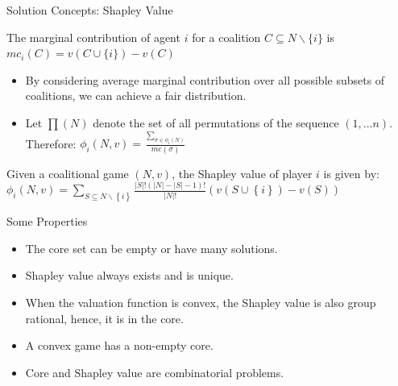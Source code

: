\documentclass{beamer}
\begin{document}
%
\begin{frame}{Solution Concepts: Shapley Value}
    \begin{definition} \label{dfn:marginalcontribution}
        The {\color{blue}marginal contribution} of agent $i$ for a coalition $C \subseteq N \backslash \{i\}$ is $mc_i(C) = v(C \cup \{i\}) - v(C)$
    \end{definition}

    \begin{itemize}
        \item By considering average marginal contribution over all possible subsets of coalitions, we can achieve a fair distribution.\\
        \item Let $\prod(N)$ denote the set of all permutations of the sequence $(1,...n)$. Therefore: $\phi_i(N,v) = \frac{\sum_{\sigma \in \phi_i(N)}}{mc(\sigma)}$
    \end{itemize}

    \begin{definition} \label{dfn:shapleyvalue}
        Given a coalitional game $(N,v)$, the Shapley value of player $i$ is given by: \\
        $\phi_i(N,v) = \sum_{S \subseteq N \backslash \left\{i\right\} } \frac{|S|! (|N|-|S|-1)!}{|N|!} (v(S \cup \left\{i\right\}) - v(S))$
    \end{definition}
\end{frame}
\begin{frame}{Some Properties}
    \begin{itemize}
        \item The core set can be empty or have many solutions.
        \item Shapley value always exists and is unique.
        \item When the valuation function is {\color{blue}convex}, the Shapley value is also group rational, hence, it is in the {\color{blue}core}.
        \item A convex game has a non-empty core.
        \item Core and Shapley value are combinatorial problems.
    \end{itemize}
\end{frame}
\end{document}
